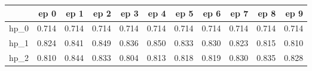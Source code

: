 \begin{tabular}{lrrrrrrrrrr}
\toprule
{} &   ep 0 &   ep 1 &   ep 2 &   ep 3 &   ep 4 &   ep 5 &   ep 6 &   ep 7 &   ep 8 &   ep 9 \\
\midrule
hp\_0 &  0.714 &  0.714 &  0.714 &  0.714 &  0.714 &  0.714 &  0.714 &  0.714 &  0.714 &  0.714 \\
hp\_1 &  0.824 &  0.841 &  0.849 &  0.836 &  0.850 &  0.833 &  0.830 &  0.823 &  0.815 &  0.810 \\
hp\_2 &  0.810 &  0.844 &  0.833 &  0.804 &  0.813 &  0.818 &  0.819 &  0.830 &  0.835 &  0.828 \\
\bottomrule
\end{tabular}

